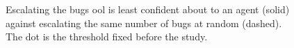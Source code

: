 \begin{figure}[t]
\caption{Escalating the bugs 	ool{} is least confident about to an agent (solid) against escalating the same number of bugs at random (dashed). The dot is the threshold fixed before the study.}
\label{fig:escalation}
\end{figure}
